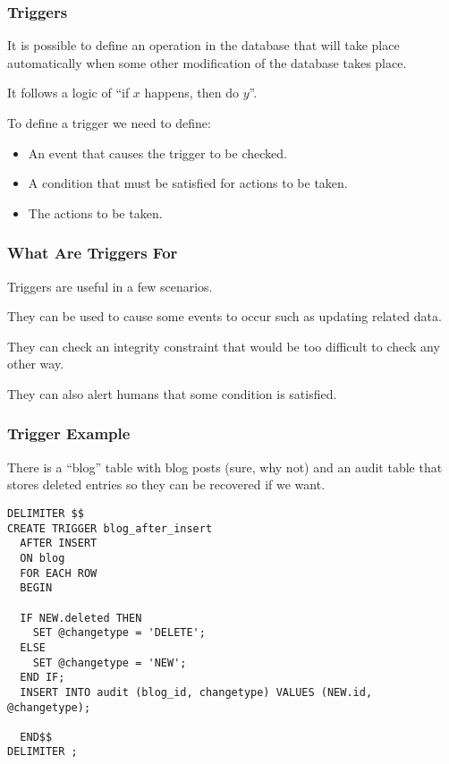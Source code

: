 \begin{frame}
\frametitle{Triggers}

It is possible to define an operation in the database that will take place automatically when some other modification of the database takes place. 

It follows a logic of ``if $x$ happens, then do $y$''. 

To define a trigger we need to define:
\begin{itemize}
	\item An event that causes the trigger to be checked.
	\item A condition that must be satisfied for actions to be taken.
	\item The actions to be taken.
\end{itemize}

\end{frame}

\begin{frame}
\frametitle{What Are Triggers For}

Triggers are useful in a few scenarios. 

They can be used to cause some events to occur such as updating related data.

They can check an integrity constraint that would be too difficult to check any other way. 

They can also alert humans that some condition is satisfied. 

\end{frame}

\begin{frame}[fragile]
\frametitle{Trigger Example}

There is a ``blog'' table with blog posts (sure, why not) and an audit table that stores deleted entries so they can be recovered if we want.

{\small
\begin{verbatim}
DELIMITER $$
CREATE TRIGGER blog_after_insert 
  AFTER INSERT 
  ON blog
  FOR EACH ROW 
  BEGIN
  
  IF NEW.deleted THEN
    SET @changetype = 'DELETE';
  ELSE
    SET @changetype = 'NEW';
  END IF;  
  INSERT INTO audit (blog_id, changetype) VALUES (NEW.id, @changetype);
		
  END$$
DELIMITER ;
\end{verbatim}
}



\end{frame}


